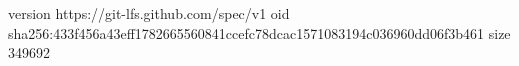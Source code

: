 version https://git-lfs.github.com/spec/v1
oid sha256:433f456a43eff1782665560841ccefc78dcac1571083194c036960dd06f3b461
size 349692
